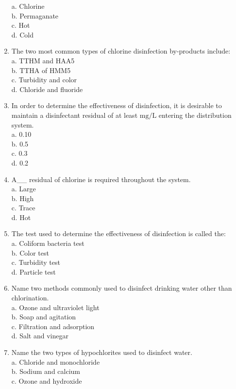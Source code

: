 \begin{enumerate}[1.]
a. Chlorine\\
b. Permaganate\\
c. Hot\\
d. Cold\\
\item The two most common types of chlorine disinfection by-products include:\\
a. TTHM and HAA5\\
b. TTHA of HMM5\\
c. Turbidity and color\\
d. Chloride and fluoride\\
\item In order to determine the effectiveness of disinfection, it is desirable to maintain a disinfectant residual of at least $\mathrm{mg} / \mathrm{L}$ entering the distribution system.\\
a. 0.10\\
b. 0.5\\
c. 0.3\\
d. 0.2\\
\item A\_\_ residual of chlorine is required throughout the system.\\
a. Large\\
b. High\\
c. Trace\\
d. Hot\\
\item The test used to determine the effectiveness of disinfection is called the:\\
a. Coliform bacteria test\\
b. Color test\\
c. Turbidity test\\
d. Particle test\\
\item Name two methods commonly used to disinfect drinking water other than chlorination.\\
a. Ozone and ultraviolet light\\
b. Soap and agitation\\
c. Filtration and adsorption\\
d. Salt and vinegar\\
\item Name the two types of hypochlorites used to disinfect water.\\
a. Chloride and monochloride\\
b. Sodium and calcium\\
c. Ozone and hydroxide\\

\end{enumerate}
